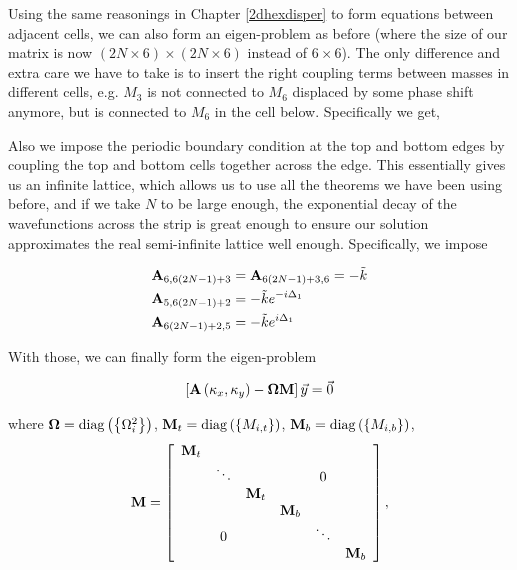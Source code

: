 Using the same reasonings in Chapter \ref{2dhexdisper} to form equations
between adjacent cells, we can also form an eigen-problem as before (where the
size of our matrix is now $(2N \times 6) \times (2N \times 6)$ instead of $6
\times 6$). The only difference and extra care we have to take is to insert the
right coupling terms between masses in different cells, e.g. $M_3$ is not
connected to $M_6$ displaced by some phase shift anymore, but is connected to
$M_6$ in the cell below. Specifically we get, 

Also we impose the periodic boundary condition at the top and bottom edges by
coupling the top and bottom cells together across the edge. This essentially
gives us an infinite lattice, which allows us to use all the theorems we have
been using before, and if we take $N$ to be large enough, the exponential decay
of the wavefunctions across the strip is great enough to ensure our solution
approximates the real semi-infinite lattice well enough. Specifically, we
impose

\begin{align}
  \mathbf{A}_{6,6(2N-1)+3}&=\mathbf{A}_{6(2N-1)+3,6}=-\tilde{k} \\
  \mathbf{A}_{5,6(2N-1)+2}&=-\tilde{k}e^{-i\Delta_1} \\
  \mathbf{A}_{6(2N-1)+2,5}&=-\tilde{k}e^{i\Delta_1} 
\end{align}

With those, we can finally form the eigen-problem

\begin{align}
  \left[\mathbf{A}\left(\kappa_{x},\kappa_{y}\right)-\mathbf{\Omega}\mathbf{M}\right]\vec{y}=\vec{0}
\label{eq:hexstripeig}
\end{align}

where $\mathbf{\Omega}=\operatorname{diag}\left(\left\{\Omega_i^2\right\}\right)$,
$\mathbf{M}_{t}=\operatorname{diag}\left(\left\{M_{i,t}\right\}\right)$,
$\mathbf{M}_{b}=\operatorname{diag}\left(\left\{M_{i,b}\right\}\right)$,
\begin{align}
\mathbf{M}=\left[
\begin{array}{cccccc}
\mathbf{M}_{t}\\
 & \ddots &  &  & 0\\
 &  & \mathbf{M}_{t}\\
 &  &  & \mathbf{M}_{b}\\
 & 0 &  &  & \ddots\\
 &  &  &  &  & \mathbf{M}_{b}
\end{array}\right],
\end{align}

